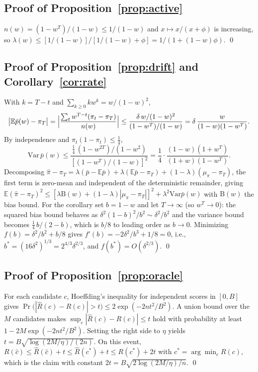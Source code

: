 \documentclass[twoside]{article}
\theoremstyle{definition}
\newcommand{\E}{\mathbb{E}}
\newcommand{\Var}{\mathrm{Var}}
\begin{document}
\subsection{Proof of Proposition~\ref{prop:active}}
$n(w)=(1-w^{T})/(1-w)\le1/(1-w)$ and $x\mapsto x/(x+\phi)$ is increasing,
so $\lambda(w)\le[1/(1-w)]/[1/(1-w)+\phi]=1/(1+(1-w)\phi)$. \qed

\subsection{Proof of Proposition~\ref{prop:drift} and
Corollary~\ref{cor:rate}}
With $k=T-t$ and $\sum_{k\ge0}kw^k=w/(1-w)^2$,
\[
\bigl|\E\bar p(w)-\pi_T\bigr|
=\Bigl|\frac{\sum_t w^{T-t}(\pi_t-\pi_T)}{n(w)}\Bigr|
\le\frac{\delta\,w/(1-w)^2}{(1-w^{T})/(1-w)}
=\delta\,\frac{w}{(1-w)(1-w^{T})}.
\]
By independence and $\pi_t(1-\pi_t)\le\tfrac14$,
\[
\Var\,\bar p(w)\le\frac{\tfrac14\,(1-w^{2T})/(1-w^{2})}
{[(1-w^{T})/(1-w)]^{2}}
=\frac14\cdot\frac{(1-w)(1+w^{T})}{(1+w)(1-w^{T})}.
\]
Decomposing
$\hat\pi-\pi_T=\lambda(\bar p-\E\bar p)+\lambda(\E\bar p-\pi_T)+(1-\lambda)(\mu_\pi-\pi_T)$,
the first term is zero-mean and independent of the deterministic
remainder, giving
$\E(\hat\pi-\pi_T)^2\le[\lambda\mathrm{B}(w)+(1-\lambda)|\mu_\pi-\pi_T|]^2
+\lambda^2\Var\bar p(w)$ with $\mathrm{B}(w)$ the bias bound. For the
corollary set $b=1-w$ and let $T\to\infty$ (so $w^{T}\to0$): the squared
bias bound behaves as $\delta^2(1-b)^2/b^2\sim\delta^2/b^2$ and the
variance bound becomes $\tfrac14\, b/(2-b)$, which is $b/8$ to leading
order as $b\to0$. Minimizing $f(b)=\delta^2/b^2+b/8$ gives
$f'(b)=-2\delta^2/b^3+1/8=0$, i.e.,
$b^{*}=(16\delta^{2})^{1/3}=2^{4/3}\delta^{2/3}$, and
$f(b^{*})=O(\delta^{2/3})$. \qed

\subsection{Proof of Proposition~\ref{prop:oracle}}
For each candidate $c$, Hoeffding's inequality for independent scores in
$[0,B]$ gives
$\Pr\bigl(|\hat R(c)-R(c)|>t\bigr)\le2\exp(-2nt^2/B^2)$. A union bound
over the $M$ candidates makes
$\sup_c|\hat R(c)-R(c)|\le t$ hold with probability at least
$1-2M\exp(-2nt^2/B^2)$. Setting the right side to $\eta$ yields
$t=B\sqrt{\log(2M/\eta)/(2n)}$. On this event,
$R(\hat c)\le\hat R(\hat c)+t\le\hat R(c^{*})+t\le R(c^{*})+2t$ with
$c^{*}=\arg\min_c R(c)$, which is the claim with constant
$2t=B\sqrt{2\log(2M/\eta)/n}$. \qed
\end{document}
